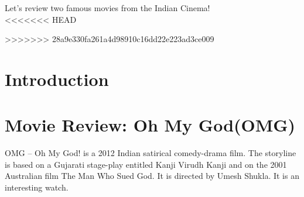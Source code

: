 \documentclass{article}
\begin{document}
Let's review two famous movies from the Indian Cinema!\\
<<<<<<< HEAD

>>>>>>> 28a9e330fa261a4d98910c16dd22e223ad3ce009

\section{Introduction}
\section{Movie Review: Oh My God(OMG)}
OMG – Oh My God! is a 2012 Indian satirical comedy-drama film. The storyline is based on a Gujarati stage-play entitled Kanji Virudh Kanji and on the 2001 Australian film The Man Who Sued God. It is directed by Umesh Shukla. It is an interesting watch.
\end{document}
